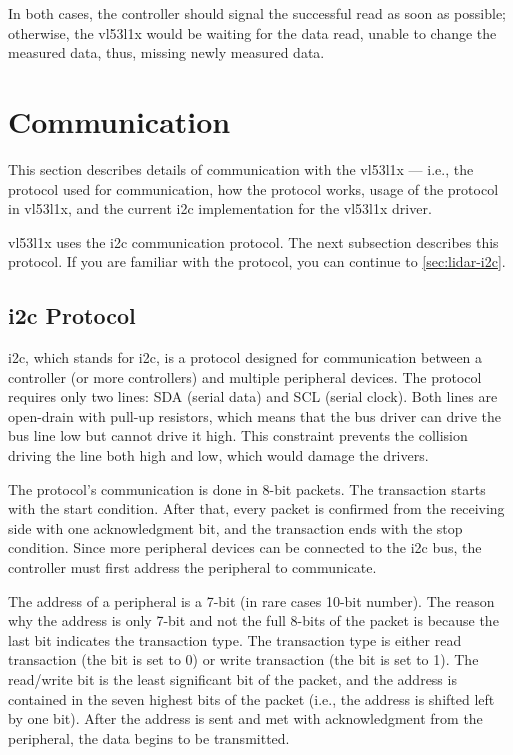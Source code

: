 \documentclass[
  digital,     %
  oneside,     %
  nosansbold,  %
  nocolorbold, %
  nolof,         %
  nolot,         %
]{fithesis4}
\begin{document}
In both cases, the controller should signal the successful read as soon as possible; otherwise, the
\gls{vl53l1x} would be waiting for the data read,  unable to change the measured data, thus, missing
newly measured data.

\section{ Communication }
This section describes details of communication with the \gls{vl53l1x} --- i.e., the protocol used
for communication, how the protocol works, usage of the protocol in \gls{vl53l1x}, and the current
\acrshort{i2c} implementation for the \gls{vl53l1x} driver. 

\gls{vl53l1x} uses the \acrshort{i2c} communication protocol. The next subsection describes this
protocol. If you are familiar with the protocol, you can continue to \autoref{sec:lidar-i2c}.

\subsection[ Inter-Integrated Circuit Protocol ]{ \acrlong{i2c} Protocol } \label{sec:i2c}
\acrshort{i2c}, which stands for \acrlong{i2c}, is a protocol designed for communication between a
controller (or more controllers) and multiple peripheral devices. The protocol requires only two
lines: SDA (serial data) and SCL (serial clock). Both lines are open-drain with pull-up resistors,
which means that the bus driver can drive the bus line low but cannot drive it high. This constraint
prevents the collision driving the line both high and low, which would damage the drivers.

The protocol's communication is done in 8-bit packets. The transaction starts with the start
condition. After that, every packet is confirmed from the receiving side with one acknowledgment
bit, and the transaction ends with the stop condition. Since more peripheral devices can be
connected to the \acrshort{i2c} bus, the controller must first address the peripheral to
communicate.

The address of a peripheral is a 7-bit (in rare cases 10-bit number). The reason why the address is
only 7-bit and not the full 8-bits of the packet is because the last bit indicates the transaction
type. The transaction type is either read transaction (the bit is set to 0) or write transaction
(the bit is set to 1). The read/write bit is the least significant bit of the packet, and the
address is contained in the seven highest bits of the packet (i.e., the address is shifted left by
one bit). After the address is sent and met with acknowledgment from the peripheral, the data begins
to be transmitted. 
\end{document}
